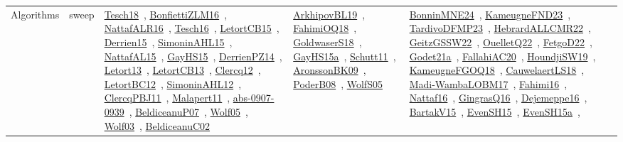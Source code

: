 {\begin{longtable}{lp{3cm}>{\raggedright\arraybackslash}p{6cm}>{\raggedright\arraybackslash}p{6cm}>{\raggedright\arraybackslash}p{8cm}}
Algorithms & sweep & \href{../works/Tesch18.pdf}{Tesch18}~\cite{Tesch18}, \href{../works/BonfiettiZLM16.pdf}{BonfiettiZLM16}~\cite{BonfiettiZLM16}, \href{../works/NattafALR16.pdf}{NattafALR16}~\cite{NattafALR16}, \href{../works/Tesch16.pdf}{Tesch16}~\cite{Tesch16}, \href{../works/LetortCB15.pdf}{LetortCB15}~\cite{LetortCB15}, \href{../works/Derrien15.pdf}{Derrien15}~\cite{Derrien15}, \href{../works/SimoninAHL15.pdf}{SimoninAHL15}~\cite{SimoninAHL15}, \href{../works/NattafAL15.pdf}{NattafAL15}~\cite{NattafAL15}, \href{../works/GayHS15.pdf}{GayHS15}~\cite{GayHS15}, \href{../works/DerrienPZ14.pdf}{DerrienPZ14}~\cite{DerrienPZ14}, \href{../works/Letort13.pdf}{Letort13}~\cite{Letort13}, \href{../works/LetortCB13.pdf}{LetortCB13}~\cite{LetortCB13}, \href{../works/Clercq12.pdf}{Clercq12}~\cite{Clercq12}, \href{../works/LetortBC12.pdf}{LetortBC12}~\cite{LetortBC12}, \href{../works/SimoninAHL12.pdf}{SimoninAHL12}~\cite{SimoninAHL12}, \href{../works/ClercqPBJ11.pdf}{ClercqPBJ11}~\cite{ClercqPBJ11}, \href{../works/Malapert11.pdf}{Malapert11}~\cite{Malapert11}, \href{../works/abs-0907-0939.pdf}{abs-0907-0939}~\cite{abs-0907-0939}, \href{../works/BeldiceanuP07.pdf}{BeldiceanuP07}~\cite{BeldiceanuP07}, \href{../works/Wolf05.pdf}{Wolf05}~\cite{Wolf05}, \href{../works/Wolf03.pdf}{Wolf03}~\cite{Wolf03}, \href{../works/BeldiceanuC02.pdf}{BeldiceanuC02}~\cite{BeldiceanuC02} & \href{../works/ArkhipovBL19.pdf}{ArkhipovBL19}~\cite{ArkhipovBL19}, \href{../works/FahimiOQ18.pdf}{FahimiOQ18}~\cite{FahimiOQ18}, \href{../works/GoldwaserS18.pdf}{GoldwaserS18}~\cite{GoldwaserS18}, \href{../works/GayHS15a.pdf}{GayHS15a}~\cite{GayHS15a}, \href{../works/Schutt11.pdf}{Schutt11}~\cite{Schutt11}, \href{../works/AronssonBK09.pdf}{AronssonBK09}~\cite{AronssonBK09}, \href{../works/PoderB08.pdf}{PoderB08}~\cite{PoderB08}, \href{../works/WolfS05.pdf}{WolfS05}~\cite{WolfS05} & \href{../works/BonninMNE24.pdf}{BonninMNE24}~\cite{BonninMNE24}, \href{../works/KameugneFND23.pdf}{KameugneFND23}~\cite{KameugneFND23}, \href{../works/TardivoDFMP23.pdf}{TardivoDFMP23}~\cite{TardivoDFMP23}, \href{../works/HebrardALLCMR22.pdf}{HebrardALLCMR22}~\cite{HebrardALLCMR22}, \href{../works/GeitzGSSW22.pdf}{GeitzGSSW22}~\cite{GeitzGSSW22}, \href{../works/OuelletQ22.pdf}{OuelletQ22}~\cite{OuelletQ22}, \href{../works/FetgoD22.pdf}{FetgoD22}~\cite{FetgoD22}, \href{../works/Godet21a.pdf}{Godet21a}~\cite{Godet21a}, \href{../works/FallahiAC20.pdf}{FallahiAC20}~\cite{FallahiAC20}, \href{../works/HoundjiSW19.pdf}{HoundjiSW19}~\cite{HoundjiSW19}, \href{../works/KameugneFGOQ18.pdf}{KameugneFGOQ18}~\cite{KameugneFGOQ18}, \href{../works/CauwelaertLS18.pdf}{CauwelaertLS18}~\cite{CauwelaertLS18}, \href{../works/Madi-WambaLOBM17.pdf}{Madi-WambaLOBM17}~\cite{Madi-WambaLOBM17}, \href{../works/Fahimi16.pdf}{Fahimi16}~\cite{Fahimi16}, \href{../works/Nattaf16.pdf}{Nattaf16}~\cite{Nattaf16}, \href{../works/GingrasQ16.pdf}{GingrasQ16}~\cite{GingrasQ16}, \href{../works/Dejemeppe16.pdf}{Dejemeppe16}~\cite{Dejemeppe16}, \href{../works/BartakV15.pdf}{BartakV15}~\cite{BartakV15}, \href{../works/EvenSH15.pdf}{EvenSH15}~\cite{EvenSH15}, \href{../works/EvenSH15a.pdf}{EvenSH15a}~\cite{EvenSH15a}, 
\end{longtable}}

